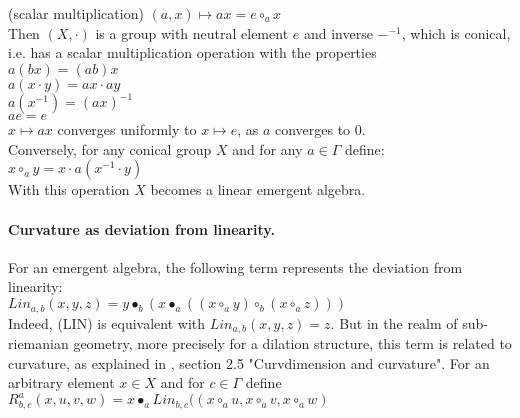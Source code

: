 \documentclass{article}
\begin{document}
(scalar multiplication) $(a,x) \mapsto  a x = e \circ_{a} x$ \\

Then $\displaystyle (X,\cdot)$ is a group with neutral element $e$ and inverse $\displaystyle -^{-1}$, which is conical, i.e. has a scalar multiplication operation with the properties \\ 

$ a (b x) = (ab) x$ \\

$ a (x \cdot y) = ax \cdot ay$ \\ 

$ a (x^{-1}) = ( ax)^{-1}$ \\

$ a e = e $\\

$ x \mapsto ax$ converges uniformly to $x \mapsto e$, as $a$ converges to $0$. \\


Conversely, for any conical group $X$ and for any $a \in \Gamma$ define: \\ 

$ x \circ_{a} y =  x \cdot a ( x^{-1} \cdot y)$ \\ 

With this operation $X$ becomes a linear emergent algebra. \\ 

\paragraph{Curvature as deviation from linearity.} For an emergent algebra, the following term represents the deviation from linearity: \\

$Lin_{a,b}(x,y,z) =   y \bullet_{b} (x \bullet_{a} ((x \circ_{a} y) \circ_{b} (x \circ_{a} z)))$ \\

Indeed, (LIN) is equivalent with  $\displaystyle Lin_{a,b}(x,y,z) = z$. But in the realm of sub-riemanian geometry, more precisely for a dilation structure, this term is related to curvature, as explained in \cite{buligasub}, section 2.5 "Curvdimension and curvature". For an arbitrary element $x \in X$ and for $c \in \Gamma$ define \\

$ R^{a}_{b,c}(x,u,v,w) = x \bullet_{a} Lin_{b,c} ((x \circ_{a} u, x \circ_{a} v, x \circ_{a} w) $ \\
\end{document}
